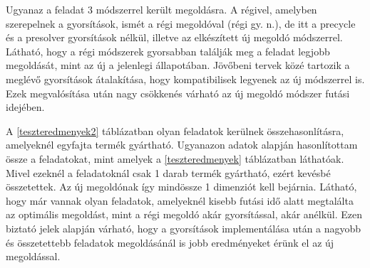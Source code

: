 Ugyanaz a feladat 3 módszerrel került megoldásra.
A régivel, amelyben szerepelnek a gyorsítások, ismét a régi megoldóval (régi gy. n.), de itt a precycle és a presolver gyorsítások nélkül, illetve az elkészített új megoldó módszerrel.
Látható, hogy a régi módszerek gyorsabban találják meg a feladat legjobb megoldását, mint az új a jelenlegi állapotában.
Jövőbeni tervek közé tartozik a meglévő gyorsítások átalakítása, hogy kompatibilisek legyenek az új módszerrel is.
Ezek megvalósítása után nagy csökkenés várható az új megoldó módszer futási idejében. 

A \ref{teszteredmenyek2} táblázatban olyan feladatok kerülnek összehasonlításra, amelyeknél egyfajta termék gyártható.
Ugyanazon adatok alapján hasonlítottam össze a feladatokat, mint amelyek a \ref{teszteredmenyek} táblázatban láthatóak.
Mivel ezeknél a feladatoknál csak 1 darab termék gyártható, ezért kevésbé összetettek.
Az új megoldónak így mindössze 1 dimenziót kell bejárnia.
Látható, hogy már vannak olyan feladatok, amelyeknél kisebb futási idő alatt megtalálta az optimális megoldást, mint a régi megoldó akár gyorsítással, akár anélkül.
Ezen biztató jelek alapján várható, hogy a gyorsítások implementálása után a nagyobb és összetettebb feladatok megoldásánál is jobb eredményeket érünk el az új megoldással.

